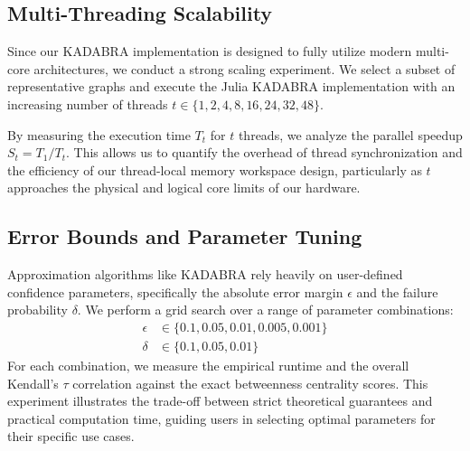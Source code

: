 \subsection{Multi-Threading Scalability}
Since our KADABRA implementation is designed to fully utilize modern multi-core architectures, we conduct a strong scaling experiment. We select a subset of representative graphs and execute the Julia KADABRA implementation with an increasing number of threads $t \in \{1, 2, 4, 8, 16, 24, 32, 48\}$. 

By measuring the execution time $T_t$ for $t$ threads, we analyze the parallel speedup $S_t = T_1 / T_t$. This allows us to quantify the overhead of thread synchronization and the efficiency of our thread-local memory workspace design, particularly as $t$ approaches the physical and logical core limits of our hardware.

\subsection{Error Bounds and Parameter Tuning}
Approximation algorithms like KADABRA rely heavily on user-defined confidence parameters, specifically the absolute error margin $\epsilon$ and the failure probability $\delta$. 
We perform a grid search over a range of parameter combinations:
\begin{align*}
    \epsilon &\in \{0.1, 0.05, 0.01, 0.005, 0.001\} \\
    \delta &\in \{0.1, 0.05, 0.01\}
\end{align*}
For each combination, we measure the empirical runtime and the overall Kendall's $\tau$ correlation against the exact betweenness centrality scores. This experiment illustrates the trade-off between strict theoretical guarantees and practical computation time, guiding users in selecting optimal parameters for their specific use cases.
